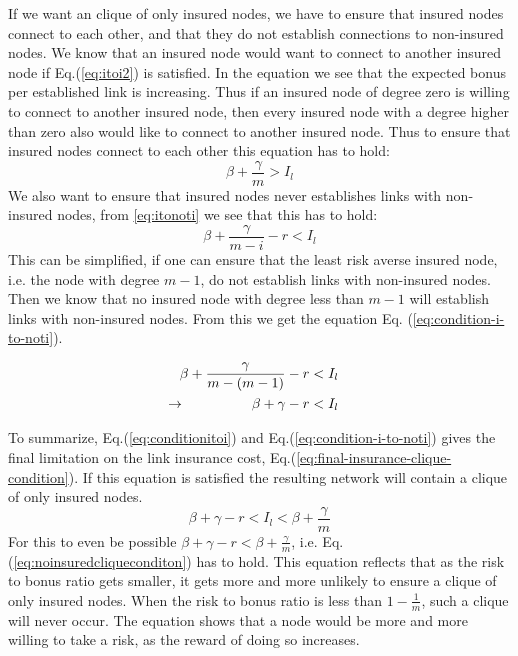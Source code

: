 If we want an clique of only insured nodes, we have to ensure that insured nodes connect to each other, and that they do not establish connections to non-insured nodes.
We know that an insured node would want to connect to another insured node if  Eq.(\ref{eq:itoi2}) is satisfied. 
In the equation we see that the expected bonus per established link is increasing. Thus if an insured node of degree zero is willing to connect to another insured node, then every insured node with a degree higher than zero also would like to connect to another insured node. Thus to ensure that insured nodes connect to each other this equation has to hold:
\begin{equation}
\beta+\frac{\gamma}{m}>I_{l}
\label{eq:conditionitoi}
\end{equation}
We also want to ensure that insured nodes never establishes links with non-insured nodes, from \ref{eq:itonoti} we see that this has to hold:
\begin{equation}
\beta+\frac{\gamma}{m-i}-r < I_{l}
\label{eq:conditionitonoti}
\end{equation}
This can be simplified, if one can ensure that the least risk averse insured node, i.e. the node with degree $m-1$, do not establish links with non-insured nodes. Then we know that no insured node with degree less than $m-1$ will establish links with non-insured nodes. From this we get the equation Eq. (\ref{eq:condition-i-to-noti}).

\begin{eqnarray}
\beta+\frac{\gamma}{m-(m-1)}-r&<I_{l} \nonumber\\
\llap{$\rightarrow$\hspace{50pt}} \beta+\gamma-r&<I_{l}
\label{eq:condition-i-to-noti}
\end{eqnarray}

To summarize, Eq.(\ref{eq:conditionitoi}) and Eq.(\ref{eq:condition-i-to-noti}) gives the final limitation on the link insurance cost, Eq.(\ref{eq:final-insurance-clique-condition}). If this equation is satisfied the resulting network will contain a clique of only insured nodes.
\begin{equation}
\beta+\gamma-r<I_{l}<\beta+\frac{\gamma}{m}
\label{eq:final-insurance-clique-condition}
\end{equation}
For this to even be possible $\beta+\gamma-r<\beta+\frac{\gamma}{m}$, i.e. Eq.(\ref{eq:noinsuredcliqueconditon}) has to hold. This equation reflects that as the risk to bonus ratio gets smaller, it gets more and more unlikely to ensure a clique of only insured nodes. When the risk to bonus ratio is less than $1-\frac{1}{m}$, such a clique will never occur. The equation shows that a node would be more and more willing to take a risk, as the reward of doing so increases.

